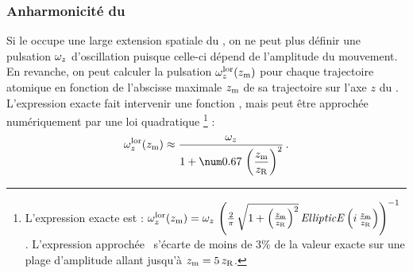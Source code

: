 
\subsubsection{Anharmonicité du \pplor}
Si le \nat occupe une large extension spatiale du \pplor, on ne peut plus définir une pulsation ${\omega_{z}}$ d'oscillation puisque celle-ci dépend de l'amplitude du mouvement. En revanche, on peut calculer la pulsation ${\omega_{z}^{\rm lor}}({z_{\rm m}})$ pour chaque trajectoire atomique en fonction de l'abscisse maximale ${z_{\rm m}}$ de sa trajectoire sur l'axe $z$ du \pd. L'expression exacte fait intervenir une fonction , mais peut être approchée numériquement par une loi quadratique%
 \footnote{L'expression exacte est : $
	{\omega_{z}^{\rm lor}}({z_{\rm m}}) = {\omega_{z}} \, \left(
	\frac {2}{\pi }
	\,\sqrt{1+{\left(\frac{{z_{\rm m}}}{{z_{\rm R}}}\right)}^{2}}
	\,{\it EllipticE}\left( i\,\frac{{z_{\rm m}}}{{z_{\rm R}}} \right)
	\right)^{-1}
$%
. L'expression approchée~ s'écarte de moins de $3\%$ de la valeur exacte sur une plage d'amplitude allant jusqu'à ${z_{\rm m}}= 5 \, {z_{\rm R}}$.} :
\begin{equation}
	\PulsLongLor(\zmaxTraj) \approx \frac{\PulsLong}{1+ \val{0.67}\, \left( \dfrac{\zmaxTraj}{\zR} \right)^2}
	\pointformule
	\label{eq:PulsLongLor}
\end{equation}

